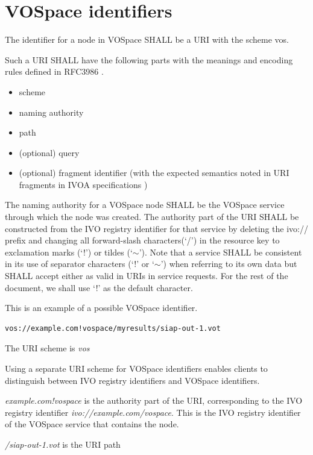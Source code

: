 \documentclass[11pt,a4paper]{ivoa}
\begin{document}
\section{VOSpace identifiers}
\label{sec:vospace identifiers}
The identifier for a node in VOSpace SHALL be a URI with the scheme vos.

Such a URI SHALL have the following parts with the meanings and encoding rules defined in RFC3986 \citep{std:RFC3986}.

\begin{itemize}
  \item scheme
  \item naming authority
  \item path
  \item (optional) query
  \item (optional) fragment identifier (with the expected semantics noted in URI fragments in IVOA specifications \citep{note:uriforms})
\end{itemize}

The naming authority for a VOSpace node SHALL be the VOSpace service through which the node was created. The authority part of the URI SHALL be constructed from the IVO registry identifier \citep{std:VOID} for that service by deleting the ivo:// prefix and changing all forward-slash characters(`/') in the resource key to exclamation marks (`!') or tildes (`$\mathtt{\sim}$'). Note that a service SHALL be consistent in its use of separator characters (`!' or `$\mathtt{\sim}$') when referring to its own data but SHALL accept either as valid in URIs in service requests. For the rest of the document, we shall use `!' as the default character.

This is an example of a possible VOSpace identifier.

\begin{verbatim}
vos://example.com!vospace/myresults/siap-out-1.vot
\end{verbatim}

The URI scheme is \emph{vos}

Using a separate URI scheme for VOSpace identifiers enables clients to distinguish between IVO registry identifiers and VOSpace identifiers.

\emph{example.com!vospace} is the authority part of the URI, corresponding to the IVO registry identifier \emph{ivo://example.com/vospace}.  This is the IVO registry identifier of the VOSpace service that contains the node.

\emph{/siap-out-1.vot} is the URI path
\end{document}

